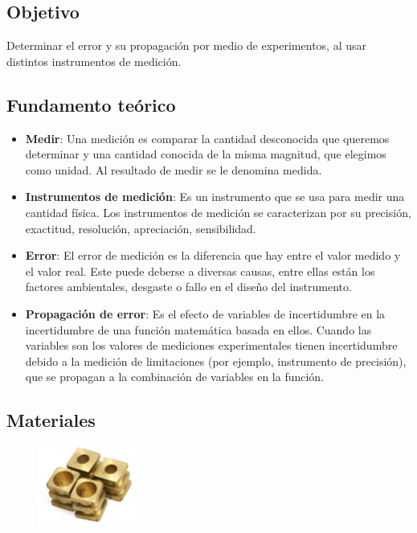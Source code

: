 \documentclass[10pt]{article}
\begin{document}
\subsection{Objetivo}
Determinar el error y su propagación por medio de experimentos, al usar distintos instrumentos de medición.

\subsection{Fundamento te\'orico}
\begin{itemize}
    \item \textbf{Medir}: Una medición es comparar la cantidad desconocida que queremos determinar y una cantidad conocida de la misma magnitud, que elegimos como unidad. Al resultado de medir se le denomina medida.
    \item \textbf{Instrumentos de medición}: Es un instrumento que se usa para medir una cantidad física. Los instrumentos de medición se caracterizan por su precisión, exactitud, resolución, apreciación, sensibilidad.
    \item \textbf{Error}: El error de medición es la diferencia que hay entre el valor medido y el valor real. Este puede deberse a diversas causas, entre ellas están los factores ambientales, desgaste o fallo en el diseño del instrumento.
    \item \textbf{Propagación de error}: Es el efecto de variables de incertidumbre en la incertidumbre de una función matemática basada en ellos. Cuando las variables son los valores de mediciones experimentales tienen incertidumbre debido a la medición de limitaciones (por ejemplo, instrumento de precisión), que se propagan a la combinación de variables en la función.
\end{itemize}

\subsection{Materiales}

\begin{figure}[H]
	\begin{center}
 		\includegraphics[width = 0.3\textwidth]{Imagenes/para.jpg}
	\end{center} 
\end{figure}
\end{document}
